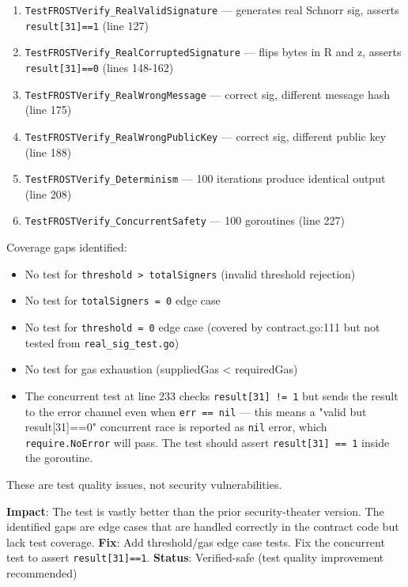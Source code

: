 \documentclass[
]{article}
\providecommand{\tightlist}{%
  \setlength{\itemsep}{0pt}\setlength{\parskip}{0pt}}
\begin{document}
\begin{enumerate}
\def\labelenumi{\arabic{enumi}.}
\tightlist
\item
  \texttt{TestFROSTVerify\_RealValidSignature} --- generates real
  Schnorr sig, asserts \texttt{result{[}31{]}==1} (line 127)
\item
  \texttt{TestFROSTVerify\_RealCorruptedSignature} --- flips bytes in R
  and z, asserts \texttt{result{[}31{]}==0} (lines 148-162)
\item
  \texttt{TestFROSTVerify\_RealWrongMessage} --- correct sig, different
  message hash (line 175)
\item
  \texttt{TestFROSTVerify\_RealWrongPublicKey} --- correct sig,
  different public key (line 188)
\item
  \texttt{TestFROSTVerify\_Determinism} --- 100 iterations produce
  identical output (line 208)
\item
  \texttt{TestFROSTVerify\_ConcurrentSafety} --- 100 goroutines (line
  227)
\end{enumerate}

Coverage gaps identified:

\begin{itemize}
\tightlist
\item
  No test for \texttt{threshold\ \textgreater{}\ totalSigners} (invalid
  threshold rejection)
\item
  No test for \texttt{totalSigners\ =\ 0} edge case
\item
  No test for \texttt{threshold\ =\ 0} edge case (covered by
  contract.go:111 but not tested from \texttt{real\_sig\_test.go})
\item
  No test for gas exhaustion (suppliedGas \textless{} requiredGas)
\item
  The concurrent test at line 233 checks \texttt{result{[}31{]}\ !=\ 1}
  but sends the result to the error channel even when
  \texttt{err\ ==\ nil} --- this means a "valid but result{[}31{]}==0"
  concurrent race is reported as \texttt{nil} error, which
  \texttt{require.NoError} will pass. The test should assert
  \texttt{result{[}31{]}\ ==\ 1} inside the goroutine.
\end{itemize}

These are test quality issues, not security vulnerabilities.

\textbf{Impact}: The test is vastly better than the prior
security-theater version. The identified gaps are edge cases that are
handled correctly in the contract code but lack test coverage.
\textbf{Fix}: Add threshold/gas edge case tests. Fix the concurrent test
to assert \texttt{result{[}31{]}==1}. \textbf{Status}: Verified-safe
(test quality improvement recommended)
\end{document}

